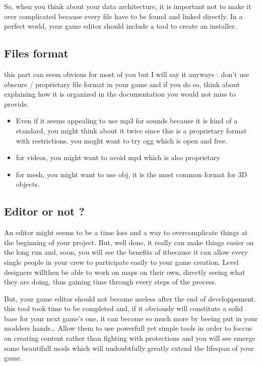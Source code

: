 \documentclass[a4paper,11pt]{article}
\begin{document}
So, when you think about your data architecture, it is important not to make it over complicated because every file have to be found and linked directly. In a perfect world, your game editor should include a tool to create an installer.

\subsection{Files format}
this part can seem obvious for most of you but I will say it anyways : don’t use obscure / proprietary file format in your game and if you do so, think about explaining how it is organized in the documentation you would not miss to provide.
\begin{itemize}
\item Even if it seems appealing to use mp3 for sounds because it is kind of a standard, you might think about it twice since this is a proprietary format with restrictions. you moght want to try ogg which is open and free.
\item for videos, you might want to avoid mp4 which is also proprietary
\item for mesh, you might want to use obj, it is the most common format for 3D objects.
\end{itemize}

\subsection{Editor or not ?}
An editor might seems to be a time loss and a way to overcomplicate things at the beginning of your project. But, well done, it really can make things easier on the long run and, soon, you will see the benefits of itbecause it can allow every single people in your crew to participate easily to your game creation. Level designers willthen be able to work on maps on their own, directly seeing what they are doing, thus gaining time through every steps of the process.

But, your game editor should not become useless after the end of developpement. this tool took time to be completed and, if it obviously will constitute a solid base for your next game’s one, it can become so much more by beeing put in your modders hands… Allow them to use powerfull yet simple tools in order to foccus on creating content rather than fighting with protections and you will see emerge some beautifull mods which will undoubtfully greatly extend the lifespan of your game.
\end{document}
